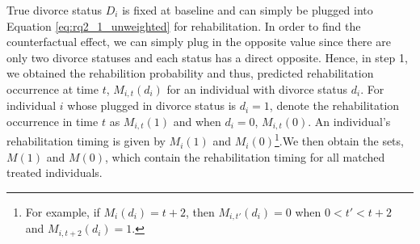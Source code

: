 \documentclass[a4paper,12pt]{article}
\theoremstyle{plain}
\theoremstyle{definition}
\theoremstyle{TheoremNum}
\theoremstyle{CorollaryNum}
\theoremstyle{PropositionNum}
\theoremstyle{TheoremNum}
\begin{document}
True divorce status $D_i$ is fixed at baseline and can simply be plugged into Equation \ref{eq:rq2_1_unweighted} for rehabilitation. In order to find the counterfactual effect, we can simply plug in the opposite value since there are only two divorce statuses and each status has a direct opposite. Hence, in step 1, we obtained the rehabilition probability and thus, predicted rehabilitation occurrence at time $t$, $M_{i,t}(d_i)$ for an individual with divorce status $d_i$. For individual $i$ whose plugged in divorce status is $d_i = 1$, denote the rehabilitation occurrence in time $t$ as $M_{i,t}(1)$ and when $d_i = 0$, $M_{i,t}(0)$. An individual's rehabilitation timing is given by $M_i(1)$ and $M_i(0)$\footnote{For example, if $M_i(d_i) = t+2$, then $M_{i,t'}(d_i)=0$ when $0<t'<t+2$ and $M_{i,t+2}(d_i)=1$.}.We then obtain the sets, $M(1)$ and $M(0)$, which contain the rehabilitation timing for all matched treated individuals. 
\end{document}
